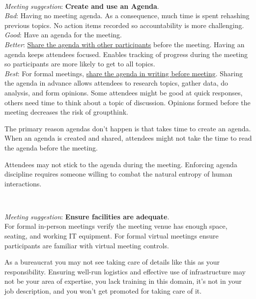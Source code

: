 \ \\
\begin{samepage}
\textit{Meeting suggestion}: \textbf{Create and use an Agenda}.\\
\textit{Bad}: Having no meeting agenda. As a consequence, much time is spent rehashing previous topics. No action items recorded so accountability is more challenging. \\
\textit{Good}: Have an agenda for the meeting. \\
\textit{Better}: \underline{Share the agenda with other participants} before the meeting. Having an agenda keeps attendees focused.  Enables tracking of progress during the meeting so participants are more likely to get to all topics.\\
\textit{Best}: For formal meetings, \underline{share the agenda in writing before meeting}. Sharing the agenda in advance allows attendees to research topics, gather data, do analysis, and form opinions. Some attendees might be good at quick responses, others need time to think about a topic of discussion. Opinions formed before the meeting decreases the risk of groupthink. 
\end{samepage}

The primary reason agendas don't happen is that takes time to create an agenda. When an agenda is created and shared, attendees might not take the time to read the agenda before the meeting. 

Attendees may not stick to the agenda during the meeting. Enforcing agenda discipline requires someone willing to combat the natural entropy of human interactions. 



\ \\
\begin{samepage}
\textit{Meeting suggestion}: \textbf{Ensure facilities are adequate}.\\
For formal in-person meetings verify the meeting venue has enough space, seating, and working IT equipment. For formal virtual meetings ensure participants are familiar with virtual meeting controls. 
\end{samepage}

As a bureaucrat you may not see taking care of details like this as your responsibility. Ensuring well-run logistics and effective use of infrastructure may not be your area of expertise, you lack training in this domain, it's not in your job description, and you won't get promoted for taking care of it. 

